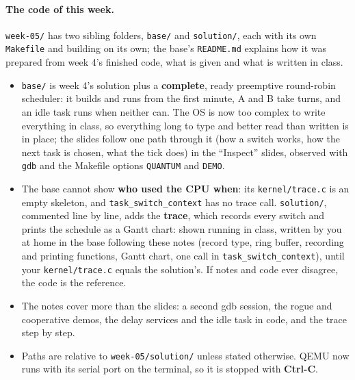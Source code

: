 \paragraph{The code of this week.} \texttt{week-05/} has two sibling folders, \texttt{base/} and \texttt{solution/}, each with its own \texttt{Makefile} and building on its own; the base's \texttt{README.md} explains how it was prepared from week 4's finished code, what is given and what is written in class.
\begin{itemize}
    \item \texttt{base/} is week 4's solution plus a \textbf{complete}, ready preemptive round-robin scheduler: it builds and runs from the first minute, A and B take turns, and an idle task runs when neither can. The OS is now too complex to write everything in class, so everything long to type and better read than written is in place; the slides follow one path through it (how a switch works, how the next task is chosen, what the tick does) in the ``Inspect'' slides, observed with \texttt{gdb} and the Makefile options \texttt{QUANTUM} and \texttt{DEMO}.
    \item The base cannot show \textbf{who used the CPU when}: its \texttt{kernel/trace.c} is an empty skeleton, and \texttt{task\_switch\_context} has no trace call. \texttt{solution/}, commented line by line, adds the \textbf{trace}, which records every switch and prints the schedule as a Gantt chart: shown running in class, written by you at home in the base following these notes (record type, ring buffer, recording and printing functions, Gantt chart, one call in \texttt{task\_switch\_context}), until your \texttt{kernel/trace.c} equals the solution's. If notes and code ever disagree, the code is the reference.
    \item The notes cover more than the slides: a second gdb session, the rogue and cooperative demos, the delay services and the idle task in code, and the trace step by step.
    \item Paths are relative to \texttt{week-05/solution/} unless stated otherwise. QEMU now runs with its serial port on the terminal, so it is stopped with \textbf{Ctrl-C}.
\end{itemize}

